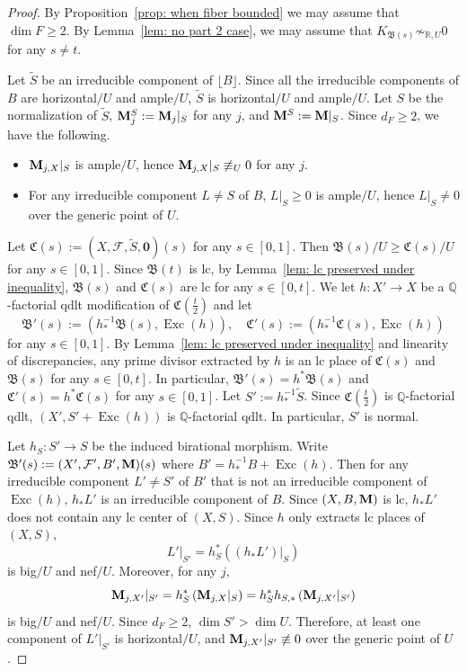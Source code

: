 \documentclass[11pt,reqno]{amsart}
\numberwithin{equation}{section}
\newcommand{\Mm}{{\bf{M}}}
\newcommand{\Cc}{\mathfrak{C}}
\newcommand{\Exc}{\operatorname{Exc}}
\newcommand{\Bb}{{\mathfrak{B}}}
\newcommand{\Ff}{\mathcal{F}}
\theoremstyle{definition}
\begin{document}
\begin{proof}
By Proposition~\ref{prop: when fiber bounded} we may assume that $\dim F \geq 2$. By Lemma~\ref{lem: no part 2 case}, we may assume that $K_{\Bb(s)}\not\sim_{\mathbb R,U}0$ for any $s\neq t$.

Let $\widetilde S$ be an irreducible component of $\lfloor B\rfloor$. Since all the irreducible components of $B$ are horizontal$/U$ and ample$/U$, $\widetilde S$ is horizontal$/U$ and ample$/U$. Let $S$ be the normalization of $\widetilde S$, $\Mm_j^S:=\Mm_j|_S$ for any $j$, and $\Mm^S:=\Mm|_S$. Since $d_F\geq 2$, we have the following.
\begin{itemize}
 \item $\Mm_{j,X}|_S$ is ample$/U$, hence $\Mm_{j,X}|_S\not\equiv_U0$ for any $j$.
 \item For any irreducible component $L\neq S$ of $B$, $L|_S\geq 0$ is ample$/U$, hence $L|_S\neq0$ over the generic point of $U$.
\end{itemize}
Let $\Cc(s):=\left(X,\Ff,\widetilde{S},\bm{0}\right)(s)$ for any $s\in [0,1]$. Then $\Bb(s)/U\geq\Cc(s)/U$ for any $s\in [0,1]$. Since $\Bb(t)$ is lc, by Lemma~\ref{lem: lc preserved under inequality}, $\Bb(s)$ and $\Cc(s)$ are lc for any $s\in [0,t]$. We let $h\colon X'\rightarrow X$ be a $\mathbb Q$-factorial qdlt modification of $\Cc\left(\frac{t}{2}\right)$ and let $$\Bb'(s):=(h^{-1}_*\Bb(s),\Exc(h)),\quad \Cc'(s):=(h^{-1}_*\Cc(s),\Exc(h))$$ for any $s\in [0,1]$. By Lemma~\ref{lem: lc preserved under inequality} and linearity of discrepancies, any prime divisor extracted by $h$ is an lc place of $\Cc(s)$ and $\Bb(s)$ for any $s\in [0,t]$. In particular, $\Bb'(s)=h^*\Bb(s)$ and $\Cc'(s)=h^*\Cc(s)$ for any $s\in [0,1]$. Let $S':=h^{-1}_*\widetilde{S}$. Since $\Cc\left(\frac{t}{2}\right)$ is $\mathbb Q$-factorial qdlt, $(X',S'+\Exc(h))$ is $\mathbb Q$-factorial qdlt. In particular, $S'$ is normal. 

Let $h_S: S'\rightarrow S$ be the induced birational morphism. Write $\Bb'(s):=(X',\Ff',B',\Mm)(s)$ where $B'=h^{-1}_*B+\Exc(h)$. Then for any irreducible component $L'\neq S'$ of $B'$ that is not an irreducible component of $\Exc(h)$, $h_*L'$ is an irreducible component of $B$. Since $(X,B,\Mm)$ is lc, $h_*L'$ does not contain any lc center of $(X,S)$. Since $h$ only extracts lc places of $(X,S)$,
$$L'|_{S'}=h_S^*\left((h_*L')|_{S}\right)$$
is big$/U$ and nef$/U$. Moreover, for any $j$,
$$\Mm_{j,X'}|_{S'}=h_S^*\left(\Mm_{j,X}|_S\right)=h_S^*h_{S,*}\left(\Mm_{j,X'}|_{S'}\right)$$
is big$/U$ and nef$/U$. Since $d_F\geq 2$, $\dim S'>\dim U$. Therefore, at least one component of $L'|_{S'}$ is horizontal$/U$, and $\Mm_{j,X'}|_{S'}\not\equiv 0$ over the generic point of $U$.


\end{proof}
\end{document}

